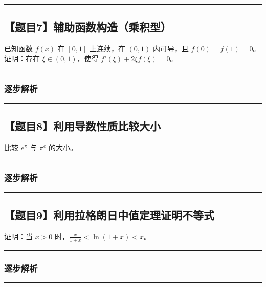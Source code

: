 \documentclass[UTF8]{ctexart}
\newenvironment{redenv}{\color{red}}{}
\newcommand{\problemrule}{\noindent\rule{\textwidth}{1.5pt}\vspace{-0.8em}}
\newcommand{\analysisrule}{\noindent\rule{\textwidth}{0.8pt}\vspace{-0.8em}}
\begin{document}
\vspace{2em}
\problemrule
\subsection*{【题目7】辅助函数构造（乘积型）}
已知函数 $f(x)$ 在 $[0, 1]$ 上连续，在 $(0, 1)$ 内可导，且 $f(0)=f(1)=0$。证明：存在 $\xi \in (0, 1)$，使得 $f'(\xi) + 2\xi f(\xi) = 0$。

\begin{redenv}
\analysisrule
\subsubsection*{逐步解析}
\vspace{8cm} %
\end{redenv}

\vspace{2em}
\problemrule
\subsection*{【题目8】利用导数性质比较大小}
比较 $e^\pi$ 与 $\pi^e$ 的大小。

\begin{redenv}
\analysisrule
\subsubsection*{逐步解析}
\vspace{6cm} %
\end{redenv}

\vspace{2em}
\problemrule
\subsection*{【题目9】利用拉格朗日中值定理证明不等式}
证明：当 $x>0$ 时，$\frac{x}{1+x} < \ln(1+x) < x$。

\begin{redenv}
\analysisrule
\subsubsection*{逐步解析}
\vspace{8cm} %
\end{redenv}

\vspace{2em}
\problemrule
\end{document}
